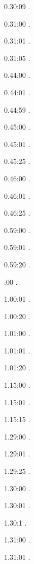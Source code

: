 \label{key}\documentclass[italian]{article}
\begin{document}
0.30:09   .

0.31:00   .

0.31:01   .

0.31:05   .

0.44:00   .

0.44:01   .

0.44:59   .

0.45:00   .

0.45:01   .

0.45:25   .

0.46:00   .

0.46:01   .

0.46:25   .

0.59:00   .

0.59:01   .

0.59:20   .

:00  .

1.00:01   . 

1.00:20  .

1.01:00   . 

1.01:01  .

1.01:20   . 

1.15:00   . 

1.15:01   . 

1.15:15   . 

1.29:00   . 

1.29:01   . 

1.29:25   . 

1.30:00   .

1.30:01   .

1.30:1   .

1.31:00   .

1.31:01   .
\end{document}
